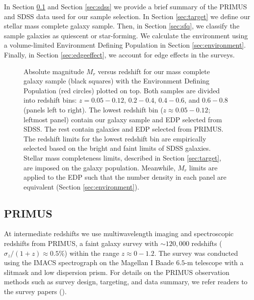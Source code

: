 \documentclass{aastex}
\begin{document}
In Section \ref{sec:primus} and Section \ref{sec:sdss} we provide a
brief summary of the PRIMUS and SDSS data used for our sample
selection. In Section \ref{sec:target} we define our stellar mass complete galaxy sample.  
Then, in Section \ref{sec:sfq}, we classify the sample galaxies as quiescent or star-forming. 
We calculate the environment
using a volume-limited Environment Defining Population in Section
\ref{sec:environment}.  Finally, in Section \ref{sec:edgeeffect}, we
account for edge effects in the surveys.

\begin{figure*}
    \begin{center}
        \leavevmode
        \caption{Absolute magnitude $M_{r}$ versus redshift for our mass complete galaxy sample (black squares) with the Environment Defining Population (red circles) plotted on top. Both samples are divided into redshift bins: $z = 0.05-0.12$, $0.2-0.4$, $0.4-0.6$, and $0.6-0.8$ (panels left to right). The lowest redshift bin ($z \approx 0.05-0.12$; leftmost panel) contain our galaxy sample and EDP selected from SDSS. The rest contain galaxies and EDP selected from PRIMUS. The redshift limits for the lowest redshift bin are empirically selected based on the bright and faint limits of SDSS galaxies. Stellar mass completeness limits, described in Section \ref{sec:target}, are imposed on the galaxy population. Meanwhile, $M_{r}$ limits are applied to the EDP such that the number density in each panel are equivalent (Section \ref{sec:environment}).} \label{fig:targetEDP}
    \end{center}
\end{figure*}
\subsection{PRIMUS} \label{sec:primus}
At intermediate redshifts we use multiwavelength imaging and
spectroscopic redshifts from PRIMUS, a faint galaxy survey with $\sim
120,000$ redshifts ($\sigma_z/(1+z) \approx 0.5 \%$) within the range
$z \approx 0-1.2$. The survey was conducted using the IMACS
spectrograph on the Magellan I Baade $6.5$-m telescope with a slitmask and low dispersion prism. For details on the PRIMUS observation methods such as survey design, targeting, and data summary, we refer readers to the survey papers (\citealt{Coil:2011aa, Cool:2013aa}). 
\end{document}
